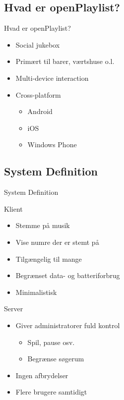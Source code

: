 \subsection{Hvad er openPlaylist?}
\begin{frame}{Hvad er openPlaylist?}
	\begin{itemize}
		\item Social jukebox
		\item Primært til barer, værtshuse o.l.
		\item Multi-device interaction
		\item Cross-platform
		\begin{itemize}
			\item Android
			\item iOS
			\item Windows Phone
		\end{itemize}
	\end{itemize}
\end{frame}

\subsection{System Definition}
\begin{frame}{System Definition}
	\begin{multicols}{2}
		Klient
		\begin{itemize}
			\item Stemme på musik
			\item Vise numre der er stemt på
			\item Tilgængelig til mange
			\item Begrænset data- og batteriforbrug
			\item Minimalistisk
		\end{itemize}
		
		\columnbreak
		
		Server
		\begin{itemize}
			\item Giver administratorer fuld kontrol
			\begin{itemize}
				\item Spil, pause osv.
				\item Begrænse søgerum
			\end{itemize}
			\item Ingen afbrydelser
			\item Flere brugere samtidigt
		\end{itemize}
	\end{multicols}
\end{frame}
